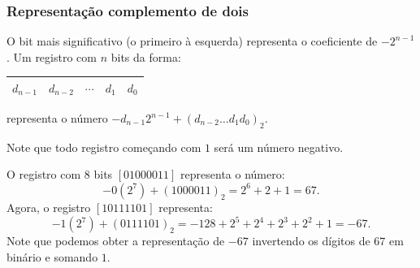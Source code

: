 \subsubsection{Representação complemento de dois}
O bit mais significativo (o primeiro à esquerda) representa o coeficiente de $-2^{n-1}$.  Um registro com $n$ bits da forma:
\begin{center}
  \begin{tabular}{|c|c|c|c|c|} \hline
    $d_{n-1}$ & $d_{n-2}$ & $\cdots$ & $d_1$ & $d_0$\\\hline
  \end{tabular}
\end{center}
representa o número $-d_{n-1}2^{n-1}+(d_{n-2}\ldots d_1d_0)_2$.

\begin{obs}
  Note que todo registro começando com $1$ será um número negativo.
\end{obs}


\begin{ex}
 O registro com $8$ bits $[01000011]$ representa o número:
 \begin{equation}
   -0(2^7) + (1000011)_2 = 2^6 + 2 + 1 = 67.
 \end{equation}
 Agora, o registro $[10111101]$ representa:
 \begin{equation}
   -1(2^7) + (0111101)_2 = -128 + 2^5 + 2^4 + 2^3 + 2^2 + 1 = -67.
 \end{equation}
 Note que podemos obter a representação de $-67$ invertendo os dígitos de $67$ em binário e somando $1$.
\end{ex}

